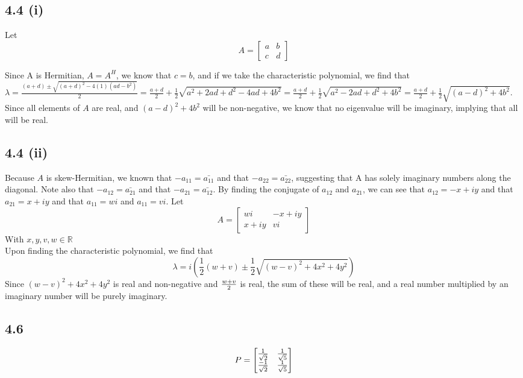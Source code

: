 \documentclass[letterpaper,12pt]{article}
\theoremstyle{definition}
\begin{document}
\subsection*{4.4 (i)}
Let 
\[A =
\begin{bmatrix}
   a & b \\ 
   c & d
\end{bmatrix}  \]

Since A is Hermitian, $A = A^H$, we know that $c=b$, and if we take the characteristic polynomial, we find that $
 \lambda = \frac{(a+d) \pm \sqrt{(a+d)^2 - 4(1)(ad-b^2)    }   }{    2} = \frac{a+d}{2}+\frac{1}{2}\sqrt{a^2 + 2ad + d^2 -4ad + 4b^2} = \frac{a+d}{2}+\frac{1}{2}\sqrt{a^2 - 2ad + d^2 + 4b^2 } = \frac{a+d}{2}+\frac{1}{2}\sqrt{(a-d)^2 + 4b^2  }$.\\
 Since all elements of $A$ are real, and $(a-d)^2 + 4b^2 $ will be non-negative, we know that no eigenvalue will be imaginary, implying that all will be real. 

\subsection*{4.4 (ii)}

Because $A$ is skew-Hermitian, we known that $-a_{11} = \bar{a_{11}}$ and that  $-a_{22} = \bar{a_{22}}$, suggesting that A has solely imaginary numbers along the diagonal. Note also that  $-a_{12} = \bar{a_{21}}$ and that  $-a_{21} = \bar{a_{12}}$. By finding the conjugate of $a_{12}$ and $a_{21}$, we can see that $a_{12} = -x + iy$ and that $a_{21} = x + iy$ and that $a_{11} = wi$ and $a_{11} = vi$. Let
\[ A = 
\begin{bmatrix}
    wi & -x + iy \\
    x + iy & vi
\end{bmatrix}\]
With $x,y,v,w \in \mathbb{R}$\\
Upon finding the characteristic polynomial, we find that 
\[ 
\lambda = i\left(\frac{1}{2}(w + v) \pm \frac{1}{2}\sqrt{ (w-v)^2 +4x^2  +4y^2    }\right)
\] 
Since $(w-v)^2 +4x^2  +4y^2$ is real and non-negative and ${w+v} \over 2$ is real, the sum of these will be real, and a real number multiplied by an imaginary number will be purely imaginary. 
\subsection*{4.6}
\[P = 
\begin{bmatrix}
    1 \over \sqrt{2}  &  1 \over \sqrt{5}\\
     -1 \over \sqrt{2} &  1 \over \sqrt{5}
\end{bmatrix}
\]
\end{document}
